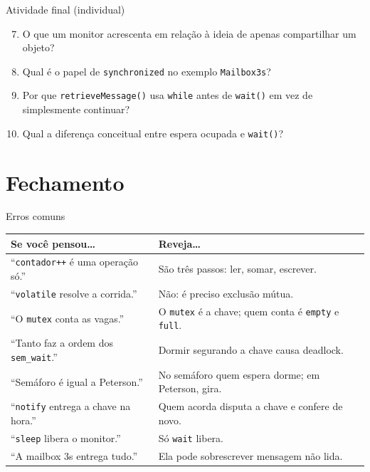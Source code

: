\documentclass[aspectratio=169]{beamer}
\begin{document}
\begin{frame}{Atividade final (individual)}
\begin{enumerate}
    \setcounter{enumi}{6}
    \item O que um monitor acrescenta em relação à ideia de apenas compartilhar um objeto?
    \item Qual é o papel de \texttt{synchronized} no exemplo \texttt{Mailbox3s}?
    \item Por que \texttt{retrieveMessage()} usa \texttt{while} antes de \texttt{wait()} em vez de simplesmente continuar?
    \item Qual a diferença conceitual entre espera ocupada e \texttt{wait()}?
\end{enumerate}
\end{frame}

\section{Fechamento}

\begin{frame}{Erros comuns}
\begin{center}
\small
\begin{tabular}{@{}R{4.6cm}R{8.4cm}@{}}
\toprule
\textbf{Se você pensou\ldots} & \textbf{Reveja\ldots} \\
\midrule
``\texttt{contador++} é uma operação só.'' & São três passos: ler, somar, escrever. \\
``\texttt{volatile} resolve a corrida.'' & Não: é preciso exclusão mútua. \\
``O \texttt{mutex} conta as vagas.'' & O \texttt{mutex} é a chave; quem conta é \texttt{empty} e \texttt{full}. \\
``Tanto faz a ordem dos \texttt{sem\_wait}.'' & Dormir segurando a chave causa deadlock. \\
``Semáforo é igual a Peterson.'' & No semáforo quem espera dorme; em Peterson, gira. \\
``\texttt{notify} entrega a chave na hora.'' & Quem acorda disputa a chave e confere de novo. \\
``\texttt{sleep} libera o monitor.'' & Só \texttt{wait} libera. \\
``A mailbox 3s entrega tudo.'' & Ela pode sobrescrever mensagem não lida. \\
\bottomrule
\end{tabular}
\end{center}
\end{frame}
\end{document}
